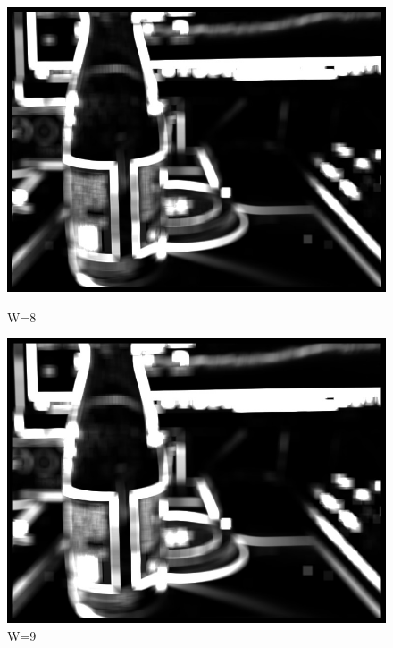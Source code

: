 \documentclass[11pt]{jarticle}
\begin{document}
\begin{figure}[t]
    \begin{minipage}{0.5\hsize}
        \centering
        \includegraphics[scale=.3]{w8.jpg}
        \caption{W=8}
    \end{minipage}
    \begin{minipage}{0.5\hsize}
        \centering
        \includegraphics[scale=.3]{w9.jpg}
        \caption{W=9}
    \end{minipage}
\end{figure}
\end{document}
